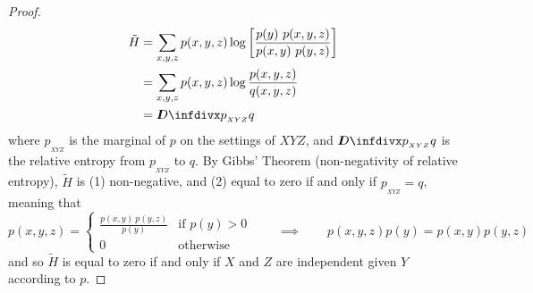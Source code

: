 \documentclass{article}
\begin{document}
\begin{proof}
\begin{align*}
		\tilde H &= \sum_{x,y, z}  p(x,y ,z) \log \left[\frac{p(y)\ p(x,y,z)}{p(x,y)\ p(y,z)} \right]  \\ %
		&= \sum_{x,y, z}  p(x,y ,z) \log \frac{p(x,y,z)}{q(x,y,z)}  \\
		&= \kldiv{p_{_{XYZ}}}{q}
	\end{align*}
	where $p_{_{XYZ}}$ is the marginal of $p$ on the settings of $XYZ$, and $\kldiv{p_{_{XYZ}}}{q}$ is the relative entropy from $p_{_{XYZ}}$ to $q$. By Gibbs' Theorem (non-negativity of relative entropy), $\tilde H$ is  (1) non-negative, and (2) equal to zero if and only if $p_{_{XYZ}} = q$, meaning that 
	\[  p(x,y,z) =\begin{cases} \frac{p(x,y)\ p(y,z)}{p(y)} & \text{if }p(y) > 0\\ 0 & \text{otherwise} \end{cases} \qquad \implies \qquad p(x,y,z) p(y) = p(x,y) p(y, z) \] 
	and so $\tilde H$ is equal to zero if and only if $X$ and $Z$ are independent given $Y$ according to $p$.
\end{proof}
\end{document}
